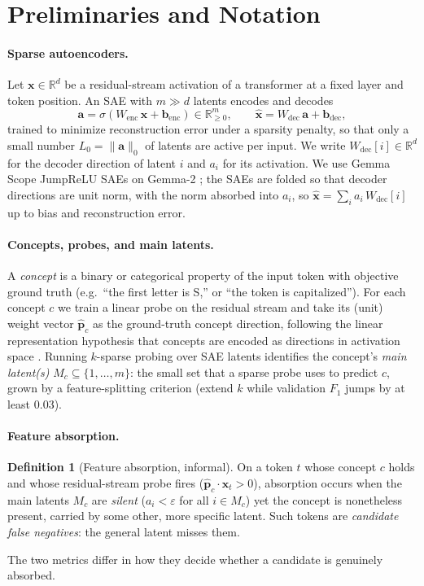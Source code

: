 \documentclass[11pt]{article}
\newcommand{\Wdec}{W_{\mathrm{dec}}}
\newcommand{\eps}{\varepsilon}
\theoremstyle{definition}
\newtheorem{definition}{Definition}
\begin{document}
\section{Preliminaries and Notation}\label{sec:prelim}
\paragraph{Sparse autoencoders.}
Let $\mathbf{x}\in\mathbb{R}^{d}$ be a residual-stream activation of a transformer at a fixed layer and token
position. An SAE with $m\gg d$ latents encodes and decodes
\begin{equation}
\mathbf{a} = \sigma\!\left(W_{\mathrm{enc}}\,\mathbf{x} + \mathbf{b}_{\mathrm{enc}}\right)\in\mathbb{R}^{m}_{\ge 0},
\qquad
\hat{\mathbf{x}} = \Wdec\,\mathbf{a} + \mathbf{b}_{\mathrm{dec}},
\end{equation}
trained to minimize reconstruction error under a sparsity penalty, so that only a small number $L_0 =
\lVert \mathbf{a}\rVert_0$ of latents are active per input. We write $\Wdec[i]\in\mathbb{R}^{d}$ for the
decoder direction of latent $i$ and $a_i$ for its activation. We use Gemma Scope JumpReLU SAEs
\citep{lieberum2024gemmascope} on Gemma-2 \citep{gemmateam2024gemma2}; the SAEs are folded so that decoder
directions are unit norm, with the norm absorbed into $a_i$, so $\hat{\mathbf x}=\sum_i a_i\,\Wdec[i]$ up to
bias and reconstruction error.

\paragraph{Concepts, probes, and main latents.}
A \emph{concept} is a binary or categorical property of the input token with objective ground truth
(e.g.\ ``the first letter is S,'' or ``the token is capitalized''). For each concept $c$ we train a linear
probe on the residual stream and take its (unit) weight vector $\hat{\mathbf p}_c$ as the ground-truth
concept direction, following the linear representation hypothesis that concepts are encoded as directions
in activation space \citep{park2024linear,elhage2022superposition}. Running $k$-sparse probing over SAE latents identifies the concept's \emph{main
latent(s)} $M_c\subseteq\{1,\dots,m\}$: the small set that a sparse probe uses to predict $c$, grown by a
feature-splitting criterion (extend $k$ while validation $F_1$ jumps by at least $0.03$).

\paragraph{Feature absorption.}
\begin{definition}[Feature absorption, informal]
On a token $t$ whose concept $c$ holds and whose residual-stream probe fires ($\hat{\mathbf p}_c\cdot
\mathbf{x}_t>0$), absorption occurs when the main latents $M_c$ are \emph{silent} ($a_i<\eps$ for all
$i\in M_c$) yet the concept is nonetheless present, carried by some other, more specific latent. Such tokens
are \emph{candidate false negatives}: the general latent misses them.
\end{definition}
The two metrics differ in how they decide whether a candidate is genuinely absorbed.
\end{document}

